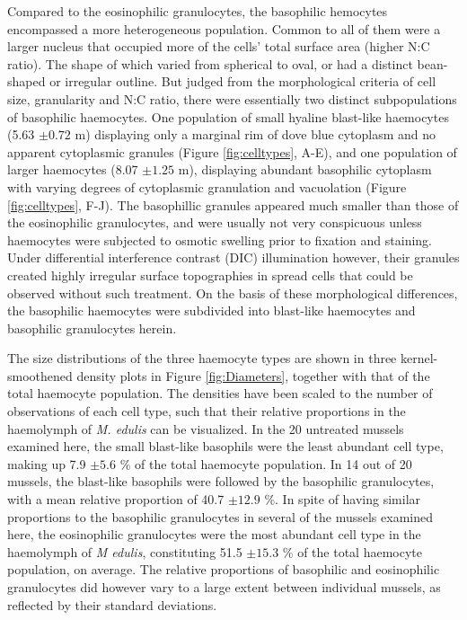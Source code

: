 Compared to the eosinophilic granulocytes, the basophilic hemocytes encompassed a more heterogeneous population. Common to all of them were a larger nucleus that occupied more of the cells' total surface area (higher N:C ratio). The shape of which varied from spherical to oval, or had a distinct bean-shaped or irregular outline. But judged from the morphological criteria of cell size, granularity and N:C ratio, there were essentially two distinct subpopulations of basophilic haemocytes. One population of small hyaline blast-like haemocytes (5.63 $\pm{0.72}$ \micro m) displaying only a marginal rim of dove blue cytoplasm and no apparent cytoplasmic granules (Figure \ref{fig:celltypes}, A-E), and one population of larger haemocytes (8.07 $\pm{1.25}$ \micro m), displaying abundant basophilic cytoplasm with varying degrees of cytoplasmic granulation and vacuolation (Figure \ref{fig:celltypes}, F-J). The basophillic granules appeared much smaller than those of the eosinophilic granulocytes, and were usually not very conspicuous unless haemocytes were subjected to osmotic swelling prior to fixation and staining. Under differential interference contrast (DIC) illumination however, their granules created highly irregular surface topographies in spread cells that could be observed without such treatment. On the basis of these morphological differences, the basophilic haemocytes were subdivided into blast-like haemocytes and basophilic granulocytes herein. 

The size distributions of the three haemocyte types are shown in three kernel-smoothened density plots in Figure \ref{fig:Diameters}, together with that of the total haemocyte population. The densities have been scaled to the number of observations of each cell type, such that their relative proportions in the haemolymph of \emph{M. edulis} can be visualized. In the 20 untreated mussels examined here, the small blast-like basophils were the least abundant cell type, making up 7.9 $\pm{5.6}$ \% of the total haemocyte population. In 14 out of 20 mussels, the blast-like basophils were followed by the basophilic granulocytes, with a mean relative proportion of 40.7 $\pm{12.9}$ \%. In spite of having similar proportions to the basophilic granulocytes in several of the mussels examined here, the eosinophilic granulocytes were the most abundant cell type in the haemolymph of \emph{M edulis}, constituting 51.5 $\pm{15.3}$ \% of the total haemocyte population, on average. The relative proportions of basophilic and eosinophilic granulocytes did however vary to a large extent between individual mussels, as reflected by their standard deviations.

